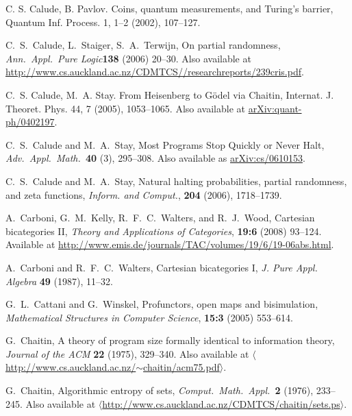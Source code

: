 \documentclass[12pt,twoside,openright]{report}
\begin{document}
\begin{thebibliography}{99}
 C.  S. Calude, B. Pavlov. Coins, quantum measurements, and Turing's barrier,  Quantum Inf. Process. 1, 1--2 (2002), 107--127.

 C.\ S.\ Calude, L.\ Staiger, S.\ A.\ Terwijn, On partial randomness, {\sl Ann.\ Appl.\ Pure Logic}\textbf{138} (2006)
20--30. Also available at
\href{http://www.cs.auckland.ac.nz/CDMTCS//researchreports/239cris.pdf}
{http://www.cs.auckland.ac.nz/CDMTCS//researchreports/239cris.pdf}.

 C.~S. Calude, M.~A. Stay. From Heisenberg to G\"odel via Chaitin,  Internat. J. Theoret. Phys.  44, 7 (2005), 1053--1065.  Also available at \href{http://arxiv.org/abs/quant-ph/0402197}{arXiv:quant-ph/0402197}.

 C.\ S.\ Calude and M.\ A.\ Stay, Most Programs Stop Quickly or Never Halt, 
{\sl Adv.\ Appl.\ Math.\ }\textbf{40} (3), 295--308. Also available as
\href{http://arxiv.org/abs/cs/0610153}
{arXiv:cs/0610153}.

 C.\ S.\ Calude and M.\ A.\ Stay, Natural halting probabilities, partial randomness, and zeta functions, \textsl{Inform. and Comput.}, \textbf{204} (2006), 
1718--1739. 

 A.\ Carboni, G.\ M.\ Kelly, R.\ F.\ C.\ Walters, and R.\ J.\ Wood, Cartesian bicategories II, \textsl{Theory and Applications of Categories}, {\bf 19:6} (2008) 93--124.  Available at \href{http://www.emis.de/journals/TAC/volumes/19/6/19-06abs.html}{http://www.emis.de/journals/TAC/volumes/19/6/19-06abs.html}.

 A.\ Carboni and R.\ F.\ C.\ Walters, Cartesian bicategories I, \textsl{J. Pure Appl. Algebra} \textbf{49} (1987), 11--32.

 G.\ L.\ Cattani and G.\ Winskel, Profunctors, open maps and bisimulation, \textsl{Mathematical Structures in Computer Science}, \textbf{15:3} (2005) 553--614.

 G.\ Chaitin, A theory of program size formally identical to information theory, {\sl Journal of the ACM} \textbf{22}
(1975), 329--340. Also available at
\href{http://www.cs.auckland.ac.nz/~chaitin/acm75.pdf}
{$\langle$http://www.cs.auckland.ac.nz/$\sim$chaitin/acm75.pdf$\rangle$}.

 G.\ Chaitin, Algorithmic entropy of sets, 
{\sl Comput.\ Math.\ Appl.\ }\textbf{2} (1976), 
233--245.  Also available at \hfill \break
\href{http://www.cs.auckland.ac.nz/CDMTCS/chaitin/sets.ps}
{$\langle$http://www.cs.auckland.ac.nz/CDMTCS/chaitin/sets.ps$\rangle$}.


\end{thebibliography}
\end{document}
